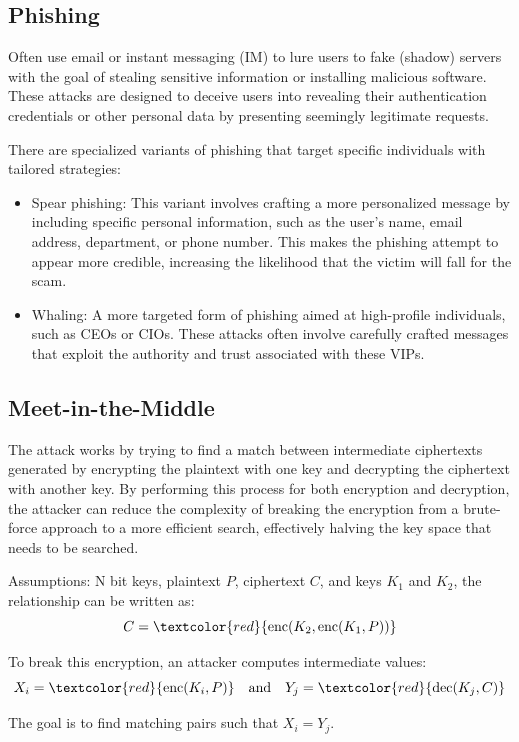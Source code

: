 \begin{center}
    \section{Phishing}
\end{center}
Often use email or instant messaging (IM) to lure users to fake (shadow) servers with the goal of stealing sensitive information or installing malicious software. These attacks are designed to deceive users into revealing their authentication credentials or other personal data by presenting seemingly legitimate requests.

There are specialized variants of phishing that target specific individuals with tailored strategies:
\begin{itemize}
    \item Spear phishing: This variant involves crafting a more personalized message by including specific personal information, such as the user’s name, email address, department, or phone number. This makes the phishing attempt to appear more credible, increasing the likelihood that the victim will fall for the scam.
    \item Whaling: A more targeted form of phishing aimed at high-profile individuals, such as CEOs or CIOs. These attacks often involve carefully crafted messages that exploit the authority and trust associated with these VIPs.
\end{itemize}

\begin{center}
    \section{Meet-in-the-Middle}
\end{center}

The attack works by trying to find a match between intermediate ciphertexts generated by encrypting the plaintext with one key and decrypting the ciphertext with another key. By performing this process for both encryption and decryption, the attacker can reduce the complexity of breaking the encryption from a brute-force approach to a more efficient search, effectively halving the key space that needs to be searched.

\hfill

\begin{tcolorbox}[colback=lightblue, colframe=blue!50!white, title=Process Overview]
    Assumptions:
    N bit keys, plaintext \( P \), ciphertext \( C \), and keys \( K_1 \) and \( K_2 \), the relationship can be written as:
    \[
    C = \textcolor{red}{\text{enc}(K_2, \text{enc}(K_1, P))}
    \]
    
    To break this encryption, an attacker computes intermediate values:
    \[
    X_i = \textcolor{red}{\text{enc}(K_i, P)} \quad \text{and} \quad Y_j = \textcolor{red}{\text{dec}(K_j, C)}
    \]
    
    The goal is to find matching pairs such that \( X_i = Y_j \).
\end{tcolorbox}

